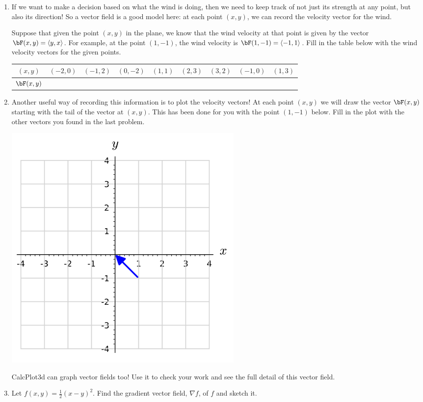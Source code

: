 {\begin{enumerate}
	\item If we want to make a decision based on what the wind is doing, then we need to keep track of not just its strength at any point, but also its direction! So a vector field is a good model here: at each point $(x,y)$, we can record the velocity vector for the wind.
	
	Suppose that given the point $(x,y)$ in the plane, we know that the wind velocity at that point is given by the vector $\bF(x,y)=\langle y, x\rangle$.  For example, at the point $(1,-1)$, the wind velocity is $\bF(1,-1)=\langle -1,1\rangle$.  Fill in the table below with the wind velocity vectors for the given points.\\
	
	\begin{tabular}{c|c}
		$(x,y)$ & $(-2,0)\quad (-1,2)\quad (0,-2)\quad (1,1)\quad (2,3)\quad (3,2)\quad (-1,0)\quad (1,3)$ \\
		\hline $\bF(x,y)$ &
	\end{tabular}
	
	\pagebreak
	
	\item Another useful way of recording this information is to plot the velocity vectors!  At each point $(x,y)$ we will draw the vector $\bF(x,y)$ starting with the tail of the vector at $(x,y)$.  This has been done for you with the point $(1,-1)$ below.  Fill in the plot with the other vectors you found in the last problem.
	
	\includegraphics[scale=0.6]{ws_21_plot.png}
	
	CalcPlot3d can graph vector fields too! Use it to check your work and see the full detail of this vector field.
	
	
	\item Let $f(x,y)=\frac{1}{2}(x-y)^2$. Find the gradient vector field, $\nabla f$, of $f$ and sketch it.
\end{enumerate}
}{}

